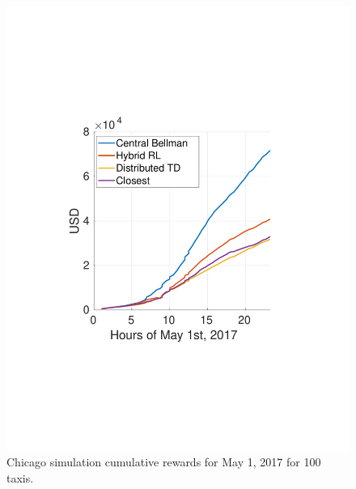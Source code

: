 \documentclass[journal]{IEEEtran}
\begin{document}
\begin{figure}
    \centering
    \includegraphics[scale = 0.5, trim={1cm 6cm 1cm 6cm}, clip]{chicago_cumulative_rewards.pdf} 
    \caption{Chicago simulation cumulative rewards for May 1, 2017 for 100 taxis.}
    \label{fig:chicago_cumulative_rewards}
\end{figure}
\end{document}
